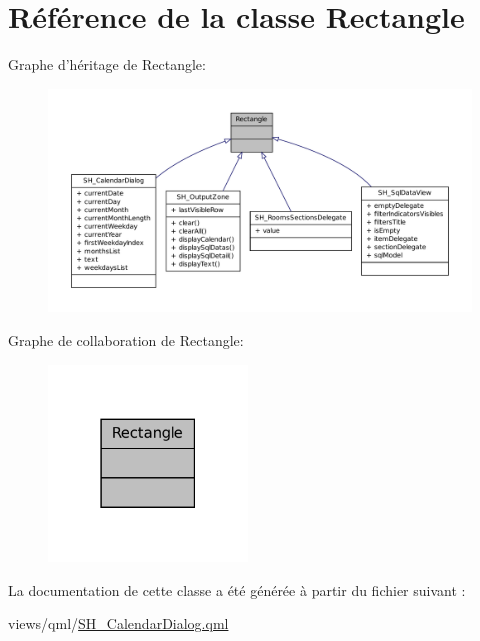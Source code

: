 \hypertarget{classRectangle}{\section{Référence de la classe Rectangle}
\label{classRectangle}
}


Graphe d'héritage de Rectangle\-:
\nopagebreak
\begin{figure}[H]
\begin{center}
\leavevmode
\includegraphics[width=350pt]{classRectangle__inherit__graph}
\end{center}
\end{figure}


Graphe de collaboration de Rectangle\-:
\nopagebreak
\begin{figure}[H]
\begin{center}
\leavevmode
\includegraphics[width=150pt]{classRectangle__coll__graph}
\end{center}
\end{figure}


La documentation de cette classe a été générée à partir du fichier suivant \-:\begin{DoxyCompactItemize}
\item 
views/qml/\hyperlink{SH__CalendarDialog_8qml}{S\-H\-\_\-\-Calendar\-Dialog.\-qml}\end{DoxyCompactItemize}
